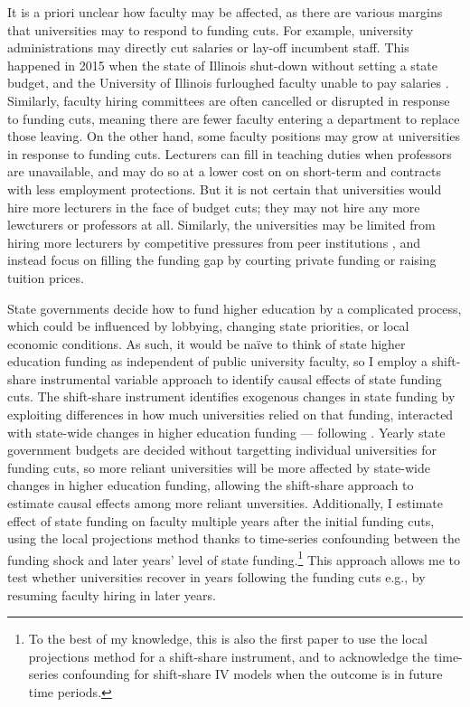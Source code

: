 It is a priori unclear how faculty may be affected, as there are various margins that universities may to respond to funding cuts.
For example, university administrations may directly cut salaries or lay-off incumbent staff.
This happened in 2015 when the state of Illinois shut-down without setting a state budget, and the University of Illinois furloughed faculty unable to pay salaries \citep{furlough2010}.
Similarly, faculty hiring committees are often cancelled or disrupted in response to funding cuts, meaning there are fewer faculty entering a department to replace those leaving.
On the other hand, some faculty positions may grow at universities in response to funding cuts.
Lecturers can fill in teaching duties when professors are unavailable, and may do so at a lower cost  on on short-term and contracts with less employment protections.
But it is not certain that universities would hire more lecturers in the face of budget cuts; they may not hire any more lewcturers or professors at all.
Similarly, the universities may be limited from hiring more lecturers by competitive pressures from peer institutions \citep{hoxby2009changing,urquiola2020markets}, and instead focus on filling the funding gap by courting private funding or raising tuition prices.

State governments decide how to fund higher education by a complicated process, which could be influenced by lobbying, changing state priorities, or local economic conditions.
As such, it would be na\"ive to think of state higher education funding as independent of public university faculty, so I employ a shift-share instrumental variable approach to identify causal effects of state funding cuts.
The shift-share instrument identifies exogenous changes in state funding by exploiting differences in how much universities relied on that funding, interacted with state-wide changes in higher education funding --- following \cite{NBERw23736,NBERw27885}.
Yearly state government budgets are decided without targetting individual universities for funding cuts, so more reliant universities will be more affected by state-wide changes in higher education funding, allowing the shift-share approach to estimate causal effects among more reliant unversities.
Additionally, I estimate effect of state funding on faculty multiple years after the initial funding cuts, using the local projections method thanks to time-series confounding between the funding shock and later years' level of state funding.\footnote{
    To the best of my knowledge, this is also the first paper to use the local projections method for a shift-share instrument, and to acknowledge the time-series confounding for shift-share IV models when the outcome is in future time periods.
}
This approach allows me to test whether universities recover in years following the funding cuts e.g., by resuming faculty hiring in later years. 

